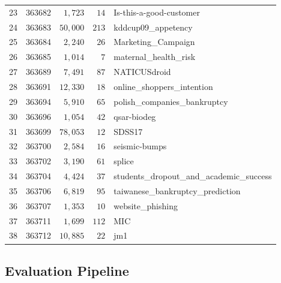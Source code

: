 \documentclass{article}
\theoremstyle{plain}
\theoremstyle{definition}
\theoremstyle{remark}
\begin{document}
\begin{table}[h]
\begin{tabular}{rrrrl}
  23 & 363682 & $1{,}723$   & $14$      & Is-this-a-good-customer \\
  24 & 363683 & $50{,}000$  & $213$     & kddcup09\_appetency \\
  25 & 363684 & $2{,}240$   & $26$      & Marketing\_Campaign \\
  26 & 363685 & $1{,}014$   & $7$       & maternal\_health\_risk \\
  27 & 363689 & $7{,}491$   & $87$      & NATICUSdroid \\
  28 & 363691 & $12{,}330$  & $18$      & online\_shoppers\_intention \\
  29 & 363694 & $5{,}910$   & $65$      & polish\_companies\_bankruptcy \\
  30 & 363696 & $1{,}054$   & $42$      & qsar-biodeg \\
  31 & 363699 & $78{,}053$  & $12$      & SDSS17 \\
  32 & 363700 & $2{,}584$   & $16$      & seismic-bumps \\
  33 & 363702 & $3{,}190$   & $61$      & splice \\
  34 & 363704 & $4{,}424$   & $37$      & students\_dropout\_and\_academic\_success \\
  35 & 363706 & $6{,}819$   & $95$      & taiwanese\_bankruptcy\_prediction \\
  36 & 363707 & $1{,}353$   & $10$      & website\_phishing \\
  37 & 363711 & $1{,}699$   & $112$     & MIC \\
  38 & 363712 & $10{,}885$  & $22$      & jm1 \\
  \bottomrule
\end{tabular}
\end{table}

\subsection{Evaluation Pipeline}
\label{app:eval}
\end{document}
